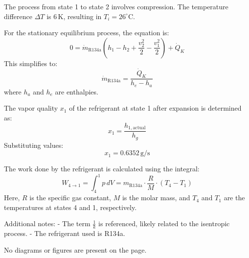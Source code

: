 The process from state 1 to state 2 involves compression. The temperature difference \( \Delta T \) is \( 6 \, \text{K} \), resulting in \( T_i = 26^\circ\text{C} \).  

For the stationary equilibrium process, the equation is:  
\[
0 = \dot{m}_{\text{R134a}} \left( h_1 - h_2 + \frac{v_2^2}{2} - \frac{v_1^2}{2} \right) + \dot{Q}_K
\]  
This simplifies to:  
\[
\dot{m}_{\text{R134a}} = \frac{\dot{Q}_K}{h_e - h_a}
\]  
where \( h_a \) and \( h_e \) are enthalpies.

The vapor quality \( x_1 \) of the refrigerant at state 1 after expansion is determined as:  
\[
x_1 = \frac{h_{1,\text{actual}}}{h_g}
\]  
Substituting values:  
\[
x_1 = 0.6352 \, \text{g/s}
\]

The work done by the refrigerant is calculated using the integral:  
\[
W_{4 \to 1} = \int_{4}^{1} p \, dV = m_{\text{R134a}} \cdot \frac{R}{M} \cdot (T_4 - T_1)
\]  
Here, \( R \) is the specific gas constant, \( M \) is the molar mass, and \( T_4 \) and \( T_1 \) are the temperatures at states 4 and 1, respectively.  

Additional notes:  
- The term \( \frac{1}{k} \) is referenced, likely related to the isentropic process.  
- The refrigerant used is R134a.  

No diagrams or figures are present on the page.